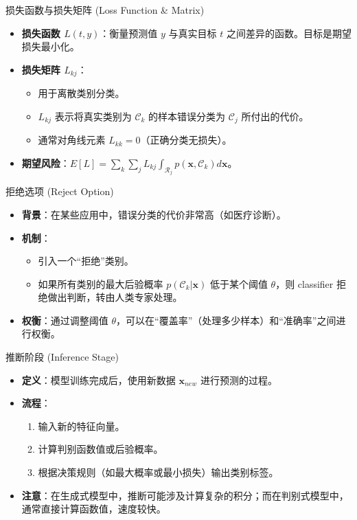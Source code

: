 \documentclass[12pt, aspectratio=169]{beamer}
\newcommand{\vect}[1]{\mathbf{#1}}
\begin{document}
\begin{frame}{损失函数与损失矩阵 (Loss Function \& Matrix)}
    \begin{itemize}
        \item \textbf{损失函数 $L(t, y)$}：衡量预测值 $y$ 与真实目标 $t$ 之间差异的函数。目标是期望损失最小化。
        \item \textbf{损失矩阵 $L_{kj}$}：
        \begin{itemize}
            \item 用于离散类别分类。
            \item $L_{kj}$ 表示将真实类别为 $\mathcal{C}_k$ 的样本错误分类为 $\mathcal{C}_j$ 所付出的代价。
            \item 通常对角线元素 $L_{kk}=0$（正确分类无损失）。
        \end{itemize}
        \item \textbf{期望风险}：$E[L] = \sum_k \sum_j L_{kj} \int_{\mathcal{R}_j} p(\vect{x}, \mathcal{C}_k) d\vect{x}$。
    \end{itemize}
\end{frame}

\begin{frame}{拒绝选项 (Reject Option)}
    \begin{itemize}
        \item \textbf{背景}：在某些应用中，错误分类的代价非常高（如医疗诊断）。
        \item \textbf{机制}：
        \begin{itemize}
            \item 引入一个“拒绝”类别。
            \item 如果所有类别的最大后验概率 $p(\mathcal{C}_k|\vect{x})$ 低于某个阈值 $\theta$，则 classifier 拒绝做出判断，转由人类专家处理。
        \end{itemize}
        \item \textbf{权衡}：通过调整阈值 $\theta$，可以在“覆盖率”（处理多少样本）和“准确率”之间进行权衡。
    \end{itemize}
\end{frame}

\begin{frame}{推断阶段 (Inference Stage)}
    \begin{itemize}
        \item \textbf{定义}：模型训练完成后，使用新数据 $\vect{x}_{new}$ 进行预测的过程。
        \item \textbf{流程}：
        \begin{enumerate}
            \item 输入新的特征向量。
            \item 计算判别函数值或后验概率。
            \item 根据决策规则（如最大概率或最小损失）输出类别标签。
        \end{enumerate}
        \item \textbf{注意}：在生成式模型中，推断可能涉及计算复杂的积分；而在判别式模型中，通常直接计算函数值，速度较快。
    \end{itemize}
\end{frame}
\end{document}
